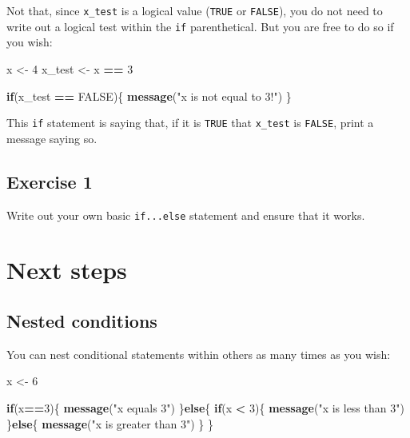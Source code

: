 \documentclass[
]{book}
\newenvironment{Shaded}{\begin{snugshade}}{\end{snugshade}}
\newcommand{\ControlFlowTok}[1]{\textcolor[rgb]{0.13,0.29,0.53}{\textbf{#1}}}
\newcommand{\DecValTok}[1]{\textcolor[rgb]{0.00,0.00,0.81}{#1}}
\newcommand{\KeywordTok}[1]{\textcolor[rgb]{0.13,0.29,0.53}{\textbf{#1}}}
\newcommand{\NormalTok}[1]{#1}
\newcommand{\OperatorTok}[1]{\textcolor[rgb]{0.81,0.36,0.00}{\textbf{#1}}}
\newcommand{\OtherTok}[1]{\textcolor[rgb]{0.56,0.35,0.01}{#1}}
\newcommand{\StringTok}[1]{\textcolor[rgb]{0.31,0.60,0.02}{#1}}
\begin{document}
Not that, since \texttt{x\_test} is a logical value (\texttt{TRUE} or \texttt{FALSE}), you do not need to write out a logical test within the \texttt{if} parenthetical. But you are free to do so if you wish:

\begin{Shaded}
\begin{Highlighting}[]
\NormalTok{x <-}\StringTok{ }\DecValTok{4}
\NormalTok{x_test <-}\StringTok{ }\NormalTok{x }\OperatorTok{==}\StringTok{ }\DecValTok{3}

\ControlFlowTok{if}\NormalTok{(x_test }\OperatorTok{==}\StringTok{ }\OtherTok{FALSE}\NormalTok{)\{}
  \KeywordTok{message}\NormalTok{(}\StringTok{"x is not equal to 3!"}\NormalTok{)}
\NormalTok{\}}
\end{Highlighting}
\end{Shaded}

This \texttt{if} statement is saying that, if it is \texttt{TRUE} that \texttt{x\_test} is \texttt{FALSE}, print a message saying so.

\hypertarget{exercise-1-6}{%
\subsection*{Exercise 1}\label{exercise-1-6}}

Write out your own basic \texttt{if...else} statement and ensure that it works.

\hypertarget{next-steps-1}{%
\section*{Next steps}\label{next-steps-1}}

\hypertarget{nested-conditions}{%
\subsection*{Nested conditions}\label{nested-conditions}}

You can nest conditional statements within others as many times as you wish:

\begin{Shaded}
\begin{Highlighting}[]
\NormalTok{x <-}\StringTok{ }\DecValTok{6}

\ControlFlowTok{if}\NormalTok{(x}\OperatorTok{==}\DecValTok{3}\NormalTok{)\{}
  \KeywordTok{message}\NormalTok{(}\StringTok{"x equals 3"}\NormalTok{)}
\NormalTok{\}}\ControlFlowTok{else}\NormalTok{\{}
  \ControlFlowTok{if}\NormalTok{(x }\OperatorTok{<}\StringTok{ }\DecValTok{3}\NormalTok{)\{}
    \KeywordTok{message}\NormalTok{(}\StringTok{"x is less than 3"}\NormalTok{)}
\NormalTok{  \}}\ControlFlowTok{else}\NormalTok{\{  }
    \KeywordTok{message}\NormalTok{(}\StringTok{"x is greater than 3"}\NormalTok{)}
\NormalTok{  \}}
\NormalTok{\}}
\end{Highlighting}
\end{Shaded}
\end{document}
